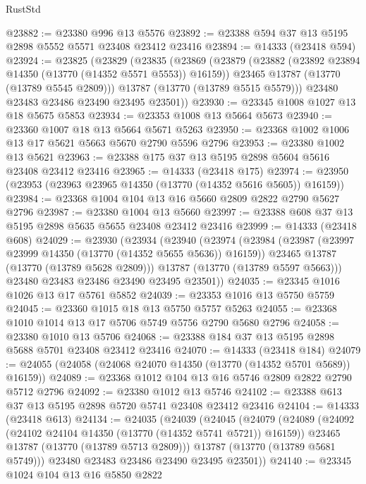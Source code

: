 \begin{lexlean}{RustStd}
\begin{coremodule}
@23882 := @23380 @996 @13 @5576
@23892 := @23388 @594 @37 @13 @5195 @2898 @5552 @5571 @23408 @23412 @23416
@23894 := @14333 (@23418 @594)
@23924 := @23825
    (@23829
      (@23835
        (@23869
          (@23879
            (@23882 (@23892 @23894 @14350 (@13770 (@14352 @5571 @5553)) @16159))
            @23465
            @13787
            (@13770 (@13789 @5545 @2809)))
          @13787
          (@13770 (@13789 @5515 @5579)))
        @23480
        @23483
        @23486
        @23490
        @23495
        @23501))
@23930 := @23345 @1008 @1027 @13 @18 @5675 @5853
@23934 := @23353 @1008 @13 @5664 @5673
@23940 := @23360 @1007 @18 @13 @5664 @5671 @5263
@23950 := @23368 @1002 @1006 @13 @17 @5621 @5663 @5670 @2790 @5596 @2796
@23953 := @23380 @1002 @13 @5621
@23963 := @23388 @175 @37 @13 @5195 @2898 @5604 @5616 @23408 @23412 @23416
@23965 := @14333 (@23418 @175)
@23974 := @23950 (@23953 (@23963 @23965 @14350 (@13770 (@14352 @5616 @5605)) @16159))
@23984 := @23368 @1004 @104 @13 @16 @5660 @2809 @2822 @2790 @5627 @2796
@23987 := @23380 @1004 @13 @5660
@23997 := @23388 @608 @37 @13 @5195 @2898 @5635 @5655 @23408 @23412 @23416
@23999 := @14333 (@23418 @608)
@24029 := @23930
    (@23934
      (@23940
        (@23974
          (@23984
            (@23987 (@23997 @23999 @14350 (@13770 (@14352 @5655 @5636)) @16159))
            @23465
            @13787
            (@13770 (@13789 @5628 @2809)))
          @13787
          (@13770 (@13789 @5597 @5663)))
        @23480
        @23483
        @23486
        @23490
        @23495
        @23501))
@24035 := @23345 @1016 @1026 @13 @17 @5761 @5852
@24039 := @23353 @1016 @13 @5750 @5759
@24045 := @23360 @1015 @18 @13 @5750 @5757 @5263
@24055 := @23368 @1010 @1014 @13 @17 @5706 @5749 @5756 @2790 @5680 @2796
@24058 := @23380 @1010 @13 @5706
@24068 := @23388 @184 @37 @13 @5195 @2898 @5688 @5701 @23408 @23412 @23416
@24070 := @14333 (@23418 @184)
@24079 := @24055 (@24058 (@24068 @24070 @14350 (@13770 (@14352 @5701 @5689)) @16159))
@24089 := @23368 @1012 @104 @13 @16 @5746 @2809 @2822 @2790 @5712 @2796
@24092 := @23380 @1012 @13 @5746
@24102 := @23388 @613 @37 @13 @5195 @2898 @5720 @5741 @23408 @23412 @23416
@24104 := @14333 (@23418 @613)
@24134 := @24035
    (@24039
      (@24045
        (@24079
          (@24089
            (@24092 (@24102 @24104 @14350 (@13770 (@14352 @5741 @5721)) @16159))
            @23465
            @13787
            (@13770 (@13789 @5713 @2809)))
          @13787
          (@13770 (@13789 @5681 @5749)))
        @23480
        @23483
        @23486
        @23490
        @23495
        @23501))
@24140 := @23345 @1024 @104 @13 @16 @5850 @2822

\end{coremodule}
\end{lexlean}
